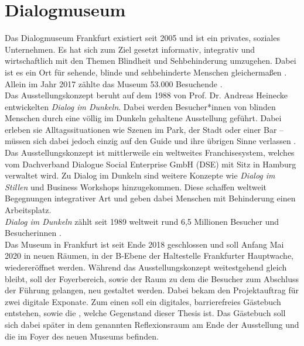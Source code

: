 \section{Dialogmuseum}
\label{sec:dialogmuseum}

Das Dialogmuseum Frankfurt existiert seit 2005 und ist ein privates, soziales 
Unternehmen. Es hat sich zum Ziel gesetzt informativ, integrativ und wirtschaftlich mit 
den Themen Blindheit und Sehbehinderung umzugehen. Dabei ist es ein Ort für sehende, 
blinde und sehbehinderte Menschen gleichermaßen \cite{dialogmuseum}. Allein im Jahr 2017 zählte das Museum 53.000 
Besuchende \cite{besucher}.\\

Das Ausstellungskonzept beruht auf dem 1988 von Prof. Dr. Andreas Heinecke entwickelten
\emph{Dialog im Dunkeln}. Dabei werden Besucher*innen von blinden Menschen durch eine 
völlig im Dunkeln gehaltene Ausstellung geführt. Dabei erleben sie Alltagssituationen
wie Szenen im Park, der Stadt oder einer Bar -- müssen sich dabei jedoch einzig auf
den Guide und ihre übrigen Sinne verlassen \cite{dialogmuseum}.\\
Das Ausstellungskonzept ist mittlerweile ein weltweites Franchisesystem, welches vom 
Dachverband Dialogue Social Enterprise GmbH (DSE) \cite{dachverband} mit Sitz in Hamburg verwaltet wird.
Zu Dialog im Dunkeln sind weitere Konzepte wie \emph{Dialog im Stillen} und Business Workshops
hinzugekommen. Diese schaffen weltweit Begegnungen integrativer Art und geben dabei 
Menschen mit Behinderung einen Arbeitsplatz.\\
\emph{Dialog im Dunkeln} zählt seit 1989 weltweit rund 6,5 Millionen Besucher und Besucherinnen
\cite{weltweit}.\\

Das Museum in Frankfurt ist seit Ende 2018 geschlossen und soll Anfang Mai 2020 in neuen Räumen, in der B-Ebene
der Haltestelle Frankfurter Hauptwache, wiedereröffnet werden. Während das Ausstellungskonzept
weitestgehend gleich bleibt, soll der Foyerbereich, sowie der Raum zu dem die Besucher zum Abschluss
der Führung gelangen, neu gestaltet werden. Dabei bekam \meso{} den Projektauftrag für zwei
digitale Exponate. Zum einen soll ein digitales, barrierefreies Gästebuch entstehen, sowie die
\shst{}, welche Gegenstand dieser Thesis ist. Das Gästebuch soll sich dabei später in dem 
genannten Reflexionsraum am Ende der Ausstellung und die \shst{} im Foyer des neuen Museums befinden.
